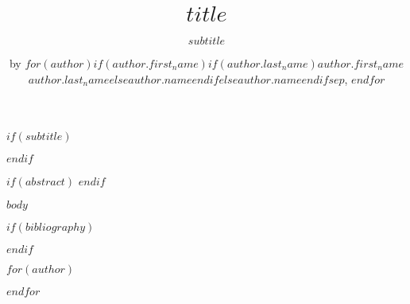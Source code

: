 \title{$title$}

$if(subtitle)$
\subtitle{%
$subtitle$
}
$endif$

\author{by $for(author)$$if(author.first_name)$$if(author.last_name)$$author.first_name$ $author.last_name$$else$$author.name$$endif$$else$$author.name$$endif$$sep$, $endfor$}

\maketitle

$if(abstract)$
$endif$

$body$

$if(bibliography)$

$endif$

$for(author)$
\address{%
$if(author.first_name)$$if(author.last_name)$$author.first_name$ $author.last_name$$else$$author.name$$endif$$else$$author.name$$endif$\\
$author.affiliation$\\%
$for(author.address)$$author.address$$sep$\\ $endfor$\\
$if(author.affiliation2)$
$author.affiliation2$\\%
$for(author.address2)$$author.address2$$sep$\\ $endfor$\\
$endif$%
$if(author.url)$$author.url$\\$endif$%
$if(author.orcid)$\textit{ORCiD: \href{https://orcid.org/$author.orcid$}{$author.orcid$}}\\$endif$%
$if(author.email)$$author.email$$endif$%
}

$endfor$
